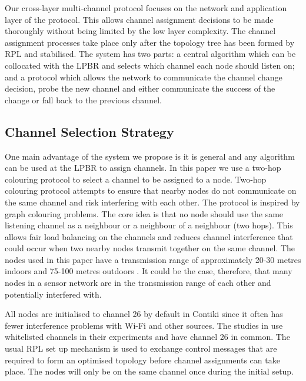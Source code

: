 Our cross-layer multi-channel protocol focuses on the network and application layer of the protocol. This allows channel assignment decisions to be made thoroughly without being limited by the low layer complexity. The channel assignment processes take place only after the topology tree has been formed by RPL and stabilised. The system has two parts: a central algorithm which can be collocated with the LPBR and selects which channel each node should listen on; and a protocol which allows the network to communicate the channel change decision, probe the new channel and either communicate the success of the change or fall back to the previous channel. 

\subsection{Channel Selection Strategy}

One main advantage of the system we propose is it is general and any algorithm can be used at the LPBR to assign channels. In this paper we use a two-hop colouring protocol to select a channel to be assigned to a node. %
Two-hop colouring protocol attempts to ensure that nearby nodes do not communicate on the same channel and risk interfering with each other. The protocol is inspired by graph colouring problems. The core idea is that no node should use the same listening channel as a neighbour or a neighbour of a neighbour (two hops).
This allows fair load balancing on the channels and reduces channel interference that could occur when two nearby nodes transmit together on the same channel. The nodes used in this paper have a transmission range of approximately 20-30 metres indoors and 75-100 metres outdoors \cite{telosb-datasheet}. It could be the case, therefore, that many nodes in a sensor network are in the transmission range of each other and potentially interfered with.
 
All nodes are initialised to channel 26 by default in Contiki since it often has fewer interference problems with Wi-Fi and other sources. The studies in \cite{chrysso, micmac, watteyne} use whitelisted channels in their experiments and have channel 26 in common. The usual RPL set up mechanism is used to exchange control messages that are required to form an optimised topology before channel assignments can take place. The nodes will only be on the same channel once during the initial setup.  
	
